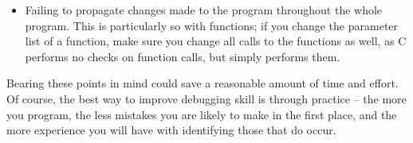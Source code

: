 \begin{itemize}
\item Failing  to propagate changes made  to the  program throughout  the
whole program. This  is particularly  so with  functions; if you
change the parameter  list of a function, make sure you change all
calls to the  functions as  well, as  C performs  no checks on
function calls, but simply performs them.

\end{itemize}
     Bearing these  points in  mind could save a reasonable amount of
time and effort. Of course, the best way to improve debugging skill
is through practice -- the  more you program, the less mistakes you
are likely to make in the first place, and  the more  experience you 
will have with identifying those that do occur.
